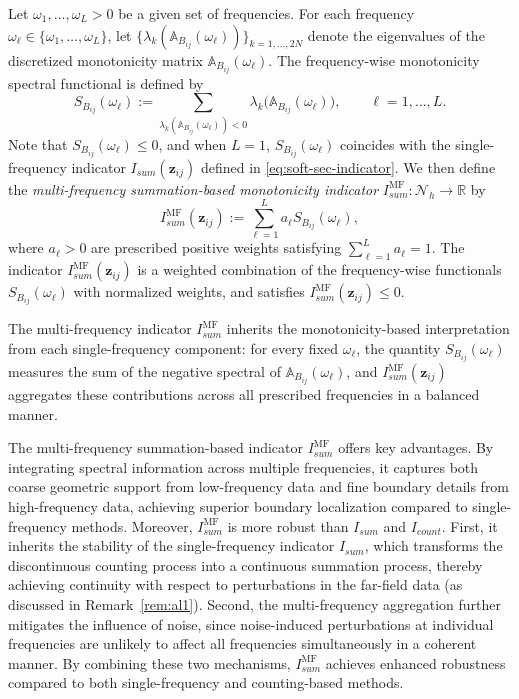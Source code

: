 \documentclass[11pt,reqno,twoside]{amsart}
\theoremstyle{definition}
\theoremstyle{remark}
\numberwithin{equation}{section}
\begin{document}
Let $\omega_1, \dots, \omega_L > 0$ be a given set of frequencies. For each frequency $\omega_\ell \in \{ \omega_1, \dots, \omega_L\}$, let $\{\lambda_k(\mathbb{A}_{B_{ij}}(\omega_\ell))\}_{k=1,\dots,2N}$ denote the eigenvalues of the discretized monotonicity matrix $\mathbb{A}_{B_{ij}}(\omega_\ell)$. The frequency-wise monotonicity spectral functional is defined by
\begin{equation*}%
S_{B_{ij}}(\omega_\ell) := \sum_{\lambda_k(\mathbb{A}_{B_{ij}}(\omega_\ell))<0} \lambda_k\bigl(\mathbb{A}_{B_{ij}}(\omega_\ell)\bigr), \qquad \ell = 1,\dots,L.
\end{equation*}
Note that $S_{B_{ij}}(\omega_\ell) \leq 0$, and when $L=1$, $S_{B_{ij}}(\omega_\ell)$ coincides with the single-frequency indicator $I_{sum}(\mathbf{z}_{ij})$ defined in \eqref{eq:soft-sec-indicator}.
We then define the \emph{multi-frequency summation-based monotonicity indicator} $I_{sum}^{\mathrm{MF}}:\mathcal{N}_h \to \mathbb{R}$ by
\begin{equation}\label{eq:mf-soft}
I_{sum}^{\mathrm{MF}}(\mathbf{z}_{ij}) := \sum_{\ell=1}^{L} a_\ell S_{B_{ij}}(\omega_\ell),
\end{equation}
where $a_\ell > 0$ are prescribed positive weights satisfying $\sum_{\ell=1}^{L} a_\ell = 1$. The indicator $I_{sum}^{\mathrm{MF}}(\mathbf{z}_{ij})$ is a weighted combination of the frequency-wise functionals $S_{B_{ij}}(\omega_\ell)$ with normalized weights, and satisfies $I_{sum}^{\mathrm{MF}}(\mathbf{z}_{ij}) \leq 0$.

The multi-frequency indicator $I_{sum}^{\mathrm{MF}}$ inherits the monotonicity-based interpretation from each single-frequency component: for every fixed $\omega_\ell$, the quantity $S_{B_{ij}}(\omega_\ell)$ measures the sum of the negative spectral of $\mathbb{A}_{B_{ij}}(\omega_\ell)$, and $I_{sum}^{\mathrm{MF}}(\mathbf{z}_{ij})$ aggregates these contributions across all prescribed frequencies in a balanced manner. 

The multi-frequency summation-based indicator $I_{sum}^{\mathrm{MF}}$ offers key advantages. By integrating spectral information across multiple frequencies, it captures both coarse geometric support from low-frequency data and fine boundary details from high-frequency data, achieving superior boundary localization compared to single-frequency methods. Moreover, $I_{sum}^{\mathrm{MF}}$ is more robust than $I_{sum}$ and $I_{count}$. First, it inherits the stability of the single-frequency indicator $I_{sum}$, which transforms the discontinuous counting process into a continuous summation process, thereby achieving continuity with respect to perturbations in the far-field data (as discussed in Remark~\ref{rem:al1}). Second, the multi-frequency aggregation further mitigates the influence of noise, since noise-induced perturbations at individual frequencies are unlikely to affect all frequencies simultaneously in a coherent manner. By combining these two mechanisms, $I_{sum}^{\mathrm{MF}}$ achieves enhanced robustness compared to both single-frequency and counting-based methods.
\end{document}
